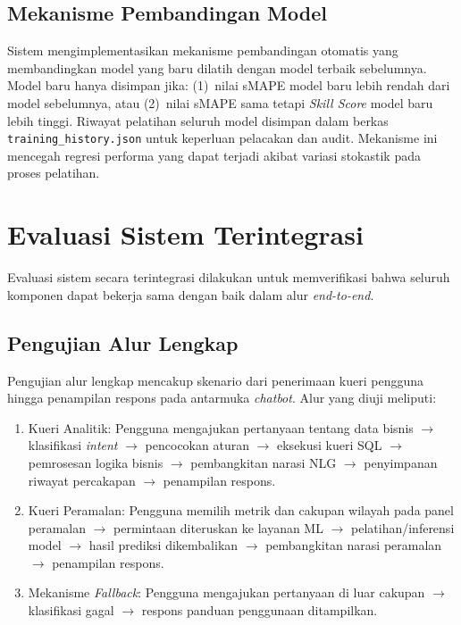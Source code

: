 \subsection{Mekanisme Pembandingan Model}

Sistem mengimplementasikan mekanisme pembandingan otomatis yang membandingkan model yang baru dilatih dengan model terbaik sebelumnya. Model baru hanya disimpan jika: (1)~nilai sMAPE model baru lebih rendah dari model sebelumnya, atau (2)~nilai sMAPE sama tetapi \textit{Skill Score} model baru lebih tinggi. Riwayat pelatihan seluruh model disimpan dalam berkas \texttt{training\_history.json} untuk keperluan pelacakan dan audit. Mekanisme ini mencegah regresi performa yang dapat terjadi akibat variasi stokastik pada proses pelatihan.

\section{Evaluasi Sistem Terintegrasi}
\label{sec:eval-sistem}

Evaluasi sistem secara terintegrasi dilakukan untuk memverifikasi bahwa seluruh komponen dapat bekerja sama dengan baik dalam alur \textit{end-to-end}.

\subsection{Pengujian Alur Lengkap}

Pengujian alur lengkap mencakup skenario dari penerimaan kueri pengguna hingga penampilan respons pada antarmuka \textit{chatbot}. Alur yang diuji meliputi:

\begin{enumerate}
    \item Kueri Analitik: Pengguna mengajukan pertanyaan tentang data bisnis $\rightarrow$ klasifikasi \textit{intent} $\rightarrow$ pencocokan aturan $\rightarrow$ eksekusi kueri SQL $\rightarrow$ pemrosesan logika bisnis $\rightarrow$ pembangkitan narasi NLG $\rightarrow$ penyimpanan riwayat percakapan $\rightarrow$ penampilan respons.
    \item Kueri Peramalan: Pengguna memilih metrik dan cakupan wilayah pada panel peramalan $\rightarrow$ permintaan diteruskan ke layanan ML $\rightarrow$ pelatihan/inferensi model $\rightarrow$ hasil prediksi dikembalikan $\rightarrow$ pembangkitan narasi peramalan $\rightarrow$ penampilan respons.
    \item Mekanisme \textit{Fallback}: Pengguna mengajukan pertanyaan di luar cakupan $\rightarrow$ klasifikasi gagal $\rightarrow$ respons panduan penggunaan ditampilkan.
\end{enumerate}

